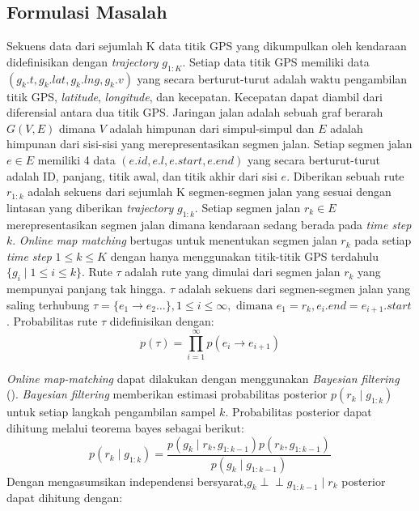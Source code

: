 \subsection{Formulasi Masalah}
\label{subsec:omm-preliminaries}
Sekuens data dari sejumlah K data titik GPS yang dikumpulkan oleh kendaraan didefinisikan dengan \textit{trajectory} $g_{1:K}$. Setiap data titik GPS memiliki data $(g_k.t,g_k.lat,g_k.lng,g_k.v)$ yang secara berturut-turut adalah waktu pengambilan titik GPS, \textit{latitude}, \textit{longitude}, dan kecepatan. Kecepatan dapat diambil dari diferensial antara dua titik GPS. Jaringan jalan adalah sebuah graf berarah $G(V,E)$ dimana $V$ adalah himpunan dari simpul-simpul dan $E$ adalah himpunan dari sisi-sisi yang merepresentasikan segmen jalan. Setiap segmen jalan $e\in E$ memiliki 4 data $(e.id, e.l, e.start, e.end)$ yang secara berturut-turut adalah ID, panjang, titik awal, dan titik akhir dari sisi $e$. Diberikan sebuah rute $r_{1:k}$ adalah sekuens dari sejumlah K segmen-segmen jalan yang sesuai dengan lintasan yang diberikan \textit{trajectory} $g_{1:k}$. Setiap segmen jalan $r_k\in E$ merepresentasikan segmen jalan dimana kendaraan sedang berada pada \textit{time step} $k$. \textit{Online map matching} bertugas untuk menentukan segmen jalan $r_k$ pada setiap \textit{time step} $1\leq k \leq K$ dengan hanya menggunakan titik-titik GPS terdahulu $\{g_i\mid 1\leq i\leq k\}$. Rute $\tau$ adalah rute yang dimulai dari segmen jalan $r_k$ yang mempunyai panjang tak hingga. $\tau$ adalah sekuens dari segmen-segmen jalan yang saling terhubung $\tau=\{e_1\rightarrow e_2\ldots\}, 1 \leq i \leq \infty, \text{ dimana } e_1=r_k, e_i.end=e_{i+1}.start$. Probabilitas rute $\tau$ didefinisikan dengan:
\begin{equation}
    p(\tau)=\prod_{i=1}^{\infty}p(e_i\rightarrow e_{i+1})
\end{equation}

\textit{Online map-matching} dapat dilakukan dengan menggunakan \textit{Bayesian filtering} (\cite{Taguchi2019}). \textit{Bayesian filtering} memberikan estimasi probabilitas posterior $p(r_k\mid g_{1:k})$ untuk setiap langkah pengambilan sampel $k$. Probabilitas posterior dapat dihitung melalui teorema bayes sebagai berikut:
\begin{equation}
    p(r_k\mid g_{1:k})=\frac{p(g_k\mid r_k,g_{1:k-1})p(r_k,g_{1:k-1})}{p(g_k\mid g_{1:k-1})}
\end{equation}
Dengan mengasumsikan independensi bersyarat,$g_k \perp\!\!\!\perp g_{1:k-1} \mid r_k $ posterior dapat dihitung dengan:

